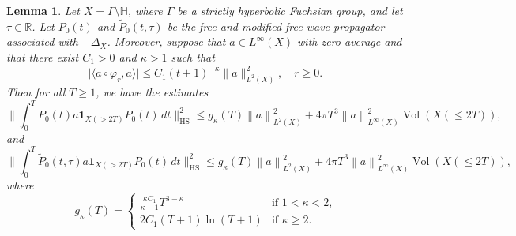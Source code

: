 \documentclass[10pt,a4paper]{amsart}
\newtheorem{lemma}{Lemma}
\newcommand{\R}{\mathbb{R}}
\newcommand{\bH}{\mathbb{H}}
\newcommand{\bHS}{\mathrm{HS}}
\newcommand{\norm}[1]{\left\lVert#1\right\rVert}
\renewcommand{\phi}{\varphi}
\DeclareMathOperator{\vol}{Vol}
\begin{document}
\begin{lemma}\label{LE:free_HS_est_exponential_mixing}
Let $X=\Gamma\setminus \bH$, where $\Gamma$ be a strictly hyperbolic Fuchsian group, and let $\tau\in\R$. Let $P_0(t)$ and $\widetilde{P}_0(t,\tau)$ be the free and modified free wave propagator associated with $-\Delta_X$. Moreover, suppose that $a\in L^\infty(X)$ with zero average and that there exist $C_1>0$ and $\kappa>1$ such that  
\begin{equation}\label{LEEQ:free_HS_est_exponential_mixing_1}
  \big|\langle a \circ \phi_r, a \rangle \big| \leq C_1 (t+1)^{-\kappa} \lVert a \rVert_{L^2(X)}^2,\quad r \geq 0.  
\end{equation}
%
Then for all $T\geq 1$, we have the estimates
%
\begin{equation*}
       \Big\lVert \int_0^T  P_0(t) a \boldsymbol{1}_{X( > 2T)} P_0(t) \,d t  \Big\rVert_{\bHS}^2 \leq g_\kappa(T) \norm{a}^2_{L^2(X)}+  4\pi T^3 \norm{a}_{L^\infty(X)}^2 \vol(X(\leq 2T)),
\end{equation*}
and 
\begin{equation*}
       \Big\lVert \int_0^T  \widetilde{P}_0(t,\tau) a \boldsymbol{1}_{X( > 2T)} P_0(t) \,d t  \Big\rVert_{\bHS}^2 \leq g_\kappa(T) \norm{a}^2_{L^2(X)}+  4\pi T^3 \norm{a}_{L^\infty(X)}^2 \vol(X(\leq 2T)),
\end{equation*}
where 
\begin{equation*}
    g_\kappa(T) = \begin{cases}
        \frac{\kappa C_1}{\kappa -1} T^{3-\kappa} & \text{if $1<\kappa<2$,}\\
        2 C_1(T+1)\ln (T+1) & \text{if $\kappa\geq 2$.}
    \end{cases}        
\end{equation*}
\end{lemma}
\end{document}
